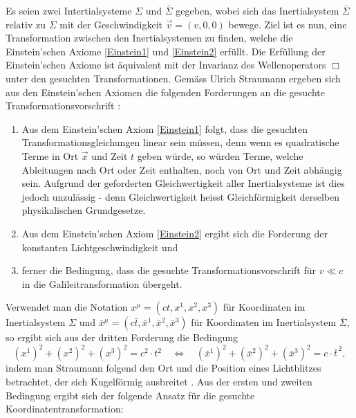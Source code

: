 \documentclass[a4paper,12pt]{article}
\numberwithin{equation}{section}
\begin{document}
Es seien zwei Intertialsysteme $\Sigma$ und $\bar{\Sigma}$ gegeben, wobei sich das Inertialsystem $\bar{\Sigma}$ relativ zu $\Sigma$ mit der Geschwindigkeit $\vec{v}=(v,0,0)$ bewege. Ziel ist es nun, eine Transformation zwischen den Inertialsystemen zu finden, welche die Einstein'schen Axiome \ref{Einstein1} und \ref{Einstein2} erfüllt. Die Erfüllung der Einstein'schen Axiome ist äquivalent mit der Invarianz des Wellenoperators $\Box$ unter den gesuchten Transformationen. Gemäss Ulrich Straumann ergeben sich aus den Einstein'schen Axiomen die folgenden Forderungen an die gesuchte Transformationsvorschrift \cite[S.9]{Straumann.2013}:
\begin{enumerate}
\item Aus dem Einstein'schen Axiom \ref{Einstein1} folgt, dass die gesuchten Transformationsgleichungen linear sein müssen, denn wenn es quadratische Terme in Ort $\vec{x}$ und Zeit $t$ geben würde, so würden Terme, welche Ableitungen nach Ort oder Zeit enthalten, noch von Ort und Zeit abhängig sein. Aufgrund der geforderten Gleichwertigkeit aller Inertialsysteme ist dies jedoch unzulässig - denn Gleichwertigkeit heisst Gleichförmigkeit derselben physikalischen Grundgesetze.
\item Aus dem Einstein'schen Axiom \ref{Einstein2} ergibt sich die Forderung der konstanten Lichtgeschwindigkeit und 
\item ferner die Bedingung, dass die gesuchte Transformationsvorschrift für $v \ll c$ in die Galileitransformation übergeht.
\end{enumerate}
Verwendet man die Notation $x^\mu = (ct,x^1,x^2,x^3)$ für Koordinaten im Inertialsystem $\Sigma$ und $\bar{x}^{\mu} = (c\bar{t},\bar{x}^{1},\bar{x}^{2},\bar{x}^{3})$ für Koordinaten im Inertialsystem $\bar{\Sigma}$, so ergibt sich aus der dritten Forderung die Bedingung \begin{equation}\label{eq:bedlor1}
(x^1)^2+(x^2)^2+(x^3)^2 = c^2 \cdot t^2 \quad \Leftrightarrow \quad (\bar{x}^{1})^2+(\bar{x}^{2})^2+(\bar{x}^{3})^2 = c\cdot \bar{t}^{\,2},
\end{equation} indem man Straumann folgend den Ort und die Position eines Lichtblitzes betrachtet, der sich Kugelförmig ausbreitet \cite[S.10]{Straumann.2013}. Aus der ersten und zweiten Bedingung ergibt sich der folgende Ansatz für die gesuchte Koordinatentransformation:
\end{document}
